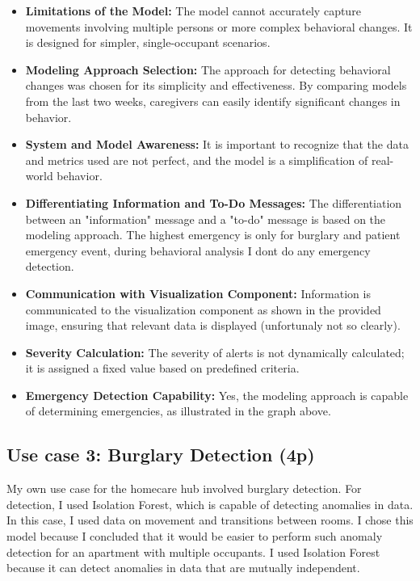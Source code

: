 \documentclass[A4,10pt]{article}
\begin{document}
\begin{itemize}
	\item \textbf{Limitations of the Model:} The model cannot accurately capture movements involving multiple persons or more complex behavioral changes. It is designed for simpler, single-occupant scenarios.
	\item \textbf{Modeling Approach Selection:} The approach for detecting behavioral changes was chosen for its simplicity and effectiveness. By comparing models from the last two weeks, caregivers can easily identify significant changes in behavior.
	\item \textbf{System and Model Awareness:} It is important to recognize that the data and metrics used are not perfect, and the model is a simplification of real-world behavior.
	\item \textbf{Differentiating Information and To-Do Messages:} The differentiation between an "information" message and a "to-do" message is based on the modeling approach. The highest emergency is only for burglary and patient emergency event, during behavioral analysis I dont do any emergency detection.
	\item \textbf{Communication with Visualization Component:} Information is communicated to the visualization component as shown in the provided image, ensuring that relevant data is displayed (unfortunaly not so clearly).
	\item \textbf{Severity Calculation:} The severity of alerts is not dynamically calculated; it is assigned a fixed value based on predefined criteria.
	\item \textbf{Emergency Detection Capability:} Yes, the modeling approach is capable of determining emergencies, as illustrated in the graph above.
\end{itemize}


\subsection{ Use case 3: Burglary Detection (4p)}

My own use case for the homecare hub involved burglary detection. For detection, I used Isolation Forest, which is capable of detecting anomalies in data. In this case, I used data on movement and transitions between rooms. I chose this model because I concluded that it would be easier to perform such anomaly detection for an apartment with multiple occupants. I used Isolation Forest because it can detect anomalies in data that are mutually independent.
\end{document}
